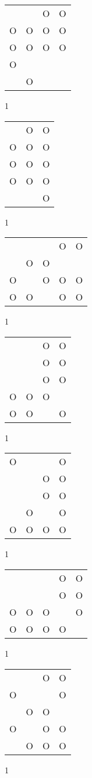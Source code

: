 \begin{tabular}{|m{0.2cm}m{0.2cm}m{0.2cm}m{0.2cm}|}\hline
 & &O&O\\
O&O&O&O\\
O&O&O&O\\
O& & & \\
 &O& & \\
\hline\end{tabular}1
\begin{tabular}{|m{0.2cm}m{0.2cm}m{0.2cm}|}\hline
 &O&O\\
O&O&O\\
O&O&O\\
O&O&O\\
 & &O\\
\hline\end{tabular}1
\begin{tabular}{|m{0.2cm}m{0.2cm}m{0.2cm}m{0.2cm}m{0.2cm}|}\hline
 & & &O&O\\
 &O&O& & \\
O& &O&O&O\\
O&O& &O&O\\
\hline\end{tabular}1
\begin{tabular}{|m{0.2cm}m{0.2cm}m{0.2cm}m{0.2cm}|}\hline
 & &O&O\\
 & &O&O\\
 & &O&O\\
O&O&O& \\
O&O& &O\\
\hline\end{tabular}1
\begin{tabular}{|m{0.2cm}m{0.2cm}m{0.2cm}m{0.2cm}|}\hline
O& & &O\\
 & &O&O\\
 & &O&O\\
 &O& &O\\
O&O&O&O\\
\hline\end{tabular}1
\begin{tabular}{|m{0.2cm}m{0.2cm}m{0.2cm}m{0.2cm}m{0.2cm}|}\hline
 & & &O&O\\
 & & &O&O\\
O&O&O& &O\\
O&O&O&O& \\
\hline\end{tabular}1
\begin{tabular}{|m{0.2cm}m{0.2cm}m{0.2cm}m{0.2cm}|}\hline
 & &O&O\\
O& & &O\\
 &O&O& \\
O& &O&O\\
 &O&O&O\\
\hline\end{tabular}1
